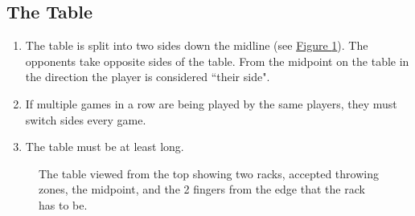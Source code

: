 	\subsection{The Table}\label{ssec:Table}
        \begin{enumerate}[label=(\roman*), ref=\roman*]
            \item \label{itm:Table,sides} The table is split into two sides down the midline (see \hyperref[fig:table]{Figure \ref*{fig:table}}).
			    The opponents take opposite sides of the table. 
			    From the midpoint on the table in the direction the player is considered ``their side". 
            \item \label{itm:Table,switch} If multiple games in a row are being played by the same players, they must switch sides every game. 
            \item \label{itm:Table,length} The table must be at least  long. 
        \end{enumerate}
        \begin{figure}[H]
            \centering
            \def\svgwidth{\columnwidth}
            
            \caption{The table viewed from the top showing two racks, accepted throwing zones, the midpoint, and the 2 fingers from the edge that the rack has to be.}
            \label{fig:table}
        \end{figure}
